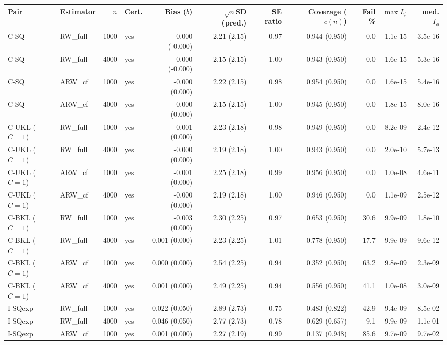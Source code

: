 \begin{tabular}{llrlrrrrrrr}
\hline
Pair & Estimator & $n$ & Cert. & Bias ($b$) & $\sqrt{n}$SD (pred.) & SE ratio & Coverage ($c(n)$) & Fail \% & $\max I_\psi$ & med. $I_\phi$ \\
\hline
C-SQ & RW\_full & 1000 & yes & -0.000 (-0.000) & 2.21 (2.15) & 0.97 & 0.944 (0.950) & 0.0 & 1.1e-15 & 3.5e-16 \\
C-SQ & RW\_full & 4000 & yes & -0.000 (-0.000) & 2.15 (2.15) & 1.00 & 0.943 (0.950) & 0.0 & 1.6e-15 & 5.3e-16 \\
C-SQ & ARW\_cf & 1000 & yes & -0.000 (0.000) & 2.22 (2.15) & 0.98 & 0.954 (0.950) & 0.0 & 1.6e-15 & 5.4e-16 \\
C-SQ & ARW\_cf & 4000 & yes & -0.000 (0.000) & 2.15 (2.15) & 1.00 & 0.945 (0.950) & 0.0 & 1.8e-15 & 8.0e-16 \\
C-UKL ($C=1$) & RW\_full & 1000 & yes & -0.001 (0.000) & 2.23 (2.18) & 0.98 & 0.949 (0.950) & 0.0 & 8.2e-09 & 2.4e-12 \\
C-UKL ($C=1$) & RW\_full & 4000 & yes & -0.000 (0.000) & 2.19 (2.18) & 1.00 & 0.943 (0.950) & 0.0 & 2.0e-10 & 5.7e-13 \\
C-UKL ($C=1$) & ARW\_cf & 1000 & yes & -0.001 (0.000) & 2.25 (2.18) & 0.99 & 0.956 (0.950) & 0.0 & 1.0e-08 & 4.6e-11 \\
C-UKL ($C=1$) & ARW\_cf & 4000 & yes & -0.000 (0.000) & 2.19 (2.18) & 1.00 & 0.946 (0.950) & 0.0 & 1.1e-09 & 2.5e-12 \\
C-BKL ($C=1$) & RW\_full & 1000 & yes & -0.003 (0.000) & 2.30 (2.25) & 0.97 & 0.653 (0.950) & 30.6 & 9.9e-09 & 1.8e-10 \\
C-BKL ($C=1$) & RW\_full & 4000 & yes & 0.001 (0.000) & 2.23 (2.25) & 1.01 & 0.778 (0.950) & 17.7 & 9.9e-09 & 9.6e-12 \\
C-BKL ($C=1$) & ARW\_cf & 1000 & yes & 0.000 (0.000) & 2.54 (2.25) & 0.94 & 0.352 (0.950) & 63.2 & 9.8e-09 & 2.3e-09 \\
C-BKL ($C=1$) & ARW\_cf & 4000 & yes & 0.001 (0.000) & 2.49 (2.25) & 0.94 & 0.556 (0.950) & 41.1 & 1.0e-08 & 3.0e-09 \\
I-SQexp & RW\_full & 1000 & yes & 0.022 (0.050) & 2.89 (2.73) & 0.75 & 0.483 (0.822) & 42.9 & 9.4e-09 & 8.5e-02 \\
I-SQexp & RW\_full & 4000 & yes & 0.046 (0.050) & 2.77 (2.73) & 0.78 & 0.629 (0.657) & 9.1 & 9.9e-09 & 1.1e-01 \\
I-SQexp & ARW\_cf & 1000 & yes & 0.001 (0.000) & 2.27 (2.19) & 0.99 & 0.137 (0.948) & 85.6 & 9.7e-09 & 9.7e-02 \\

\end{tabular}
